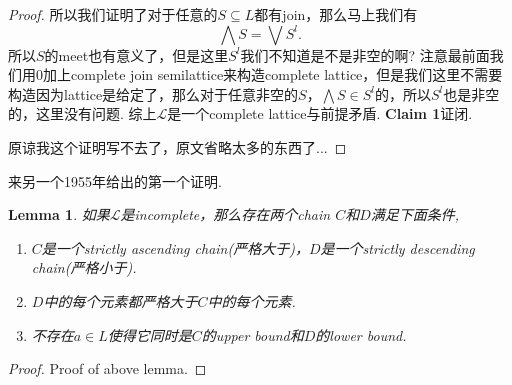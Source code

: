 \documentclass{article}
\newtheorem{lemma}[theorem]{Lemma}
\newcommand\lattice{\mathcal{L}}
\begin{document}
\begin{proof}
所以我们证明了对于任意的$S \subseteq L$都有join，那么马上我们有
$$
\bigwedge S = \bigvee S^l.
$$
所以$S$的meet也有意义了，但是这里$S^l$我们不知道是不是非空的啊? 注意最前面我们用0加上complete join semilattice来构造complete lattice，但是我们这里不需要构造因为lattice是给定了，那么对于任意非空的$S$，$\bigwedge S \in S^l$的，所以$S^l$也是非空的，这里没有问题. 综上$\lattice$是一个complete lattice与前提矛盾. \textbf{Claim 1}证闭.

原谅我这个证明写不去了，原文省略太多的东西了...
\end{proof}

{\color{red} 来另一个1955年给出的第一个证明}.

\begin{lemma}
如果$\lattice$是incomplete，那么存在两个chain $C$和$D$满足下面条件,
\begin{enumerate}
	\item $C$是一个strictly ascending chain(严格大于)，$D$是一个strictly descending chain(严格小于).
	\item $D$中的每个元素都严格大于$C$中的每个元素.
	\item 不存在$a \in L$使得它同时是$C$的upper bound和$D$的lower bound. 
\end{enumerate}
\end{lemma}

\begin{proof}
Proof of above lemma.
\end{proof}
\end{document}
